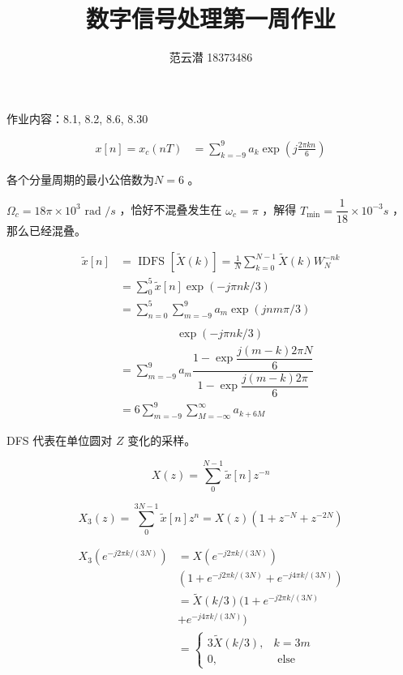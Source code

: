 \documentclass[lang=cn,11pt,a4paper,cite=authoryear]{elegantpaper}
\title{数字信号处理\quad 第一周作业}
\author{范云潜 18373486}
\institute{微电子学院 184111 班}
\date{\zhtoday}
\begin{document}
\maketitle

作业内容：8.1, 8.2, 8.6, 8.30 




\[\begin{aligned}
    x[n] = x_c(n T) &= \sum_{k = -9}^{9} a_k \exp (j \frac{2\pi k n}{6}) 
\end{aligned}\]

各个分量周期的最小公倍数为\(N = 6\) 。


\(\Omega_c = 18 \pi \times 10^3 \text{ rad } /s\) ，恰好不混叠发生在 \(\omega_c = \pi\) ，解得 \(T_{\min} = \dfrac{1}{18} \times 10^{-3}s\) ，那么已经混叠。


\[\begin{aligned}
    \tilde{x}[n] &= \text{ IDFS } [\tilde{X}(k)] = \frac{1}{N} \sum_{k = 0}^{N-1} \tilde{X}(k) W_N^{-n k} \\ 
    &= \sum_{0}^{5} \tilde{x}[n] \exp(-j \pi n k / 3) \\
    &= \sum_{n = 0}^5 \sum_{m=-9}^{9} a_m \exp (j n m \pi / 3)  \\ 
    \\ &\quad\quad\quad\quad\quad \exp (-j \pi n k / 3) \\ 
    &= \sum_{m = -9} ^{9} a_m \dfrac{1 - \exp \dfrac{j (m - k) 2 \pi N}{6}}{1 - \exp \dfrac{j (m - k) 2 \pi}{6}} \\  
    &= 6 \sum_{m = -9}^{9} \sum_{M=-\infty}^{\infty} a_{k + 6 M}
\end{aligned}\]



DFS 代表在单位圆对 \(Z\) 变化的采样。

\[X(z) = \sum_{0}^{N-1} \tilde{x}[n] z^{-n} \] 

\[X_3(z) = \sum_{0} ^{3 N - 1} \tilde{x}[n] z^{n} = X(z) ( 1  +z^{-N} + z^{-2N})\]  

\[\begin{aligned}
    X_3(e^{-j 2\pi k / (3 N)}) &= X(e^{-j 2\pi k / (3N)}) \\
    & (1 + e^{-j 2\pi k / (3N)} + e^{-j 4\pi k / (3N)}) \\ 
    &= \tilde{X}(k/3)  (1 + e^{-j 2\pi k / (3N)} \\
    & + e^{-j 4\pi k / (3N)}) \\ 
    &= \left\{\begin{aligned}
        3 \tilde{X}(k/3), & k = 3m \\ 
        0, & \text{ else}
    \end{aligned}\right. 
\end{aligned}\]
\end{document}
